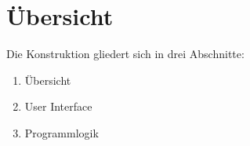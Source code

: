
\chapter{Übersicht}

Die Konstruktion gliedert sich in drei Abschnitte:

\begin{enumerate}
	\item Übersicht
    \item User Interface
    \item Programmlogik
\end{enumerate}